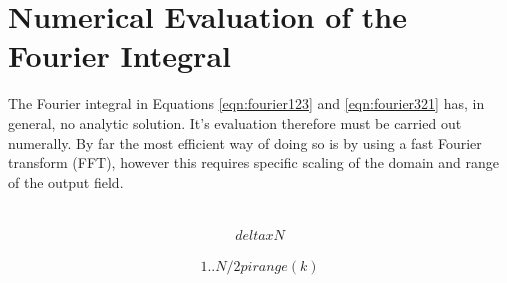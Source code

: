 \section{Numerical Evaluation of the Fourier Integral}

The Fourier integral in Equations \ref{eqn:fourier123} and
\ref{eqn:fourier321} has, in general, no analytic solution.  It's
evaluation therefore must be carried out numerally.  By far the most
efficient way of doing so is by using a fast Fourier transform (FFT),
however this requires specific scaling of the domain and range of the
output field.

\begin{align}

\end{align}

\begin{align}
deltax N
\end{align}

\begin{align}
1..N / 2 pi range(k)
\end{align}

